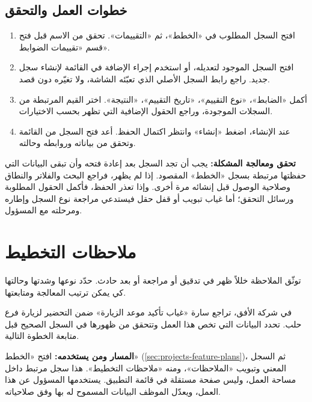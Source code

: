\subsection{خطوات العمل والتحقق}
\begin{enumerate}
\item افتح السجل المطلوب في «الخطط»، ثم «التقييمات». تحقق من الاسم قبل فتح قسم «تقييمات الضوابط».
\item افتح السجل الموجود لتعديله، أو استخدم إجراء الإضافة في القائمة لإنشاء سجل جديد. راجع رابط السجل الأصلي الذي تعبّئه الشاشة، ولا تغيّره دون قصد.
\item أكمل «الضابط»، «نوع التقييم»، «تاريخ التقييم»، «النتيجة». اختر القيم المرتبطة من السجلات الموجودة، وراجع الحقول الإضافية التي تظهر بحسب الاختيارات.
\item عند الإنشاء، اضغط «إنشاء» وانتظر اكتمال الحفظ. أعد فتح السجل من القائمة وتحقق من بياناته وروابطه وحالته.
\end{enumerate}

\textbf{تحقق ومعالجة المشكلة:} يجب أن تجد السجل بعد إعادة فتحه وأن تبقى البيانات التي حفظتها مرتبطة بسجل «الخطط» المقصود. إذا لم يظهر، فراجع البحث والفلاتر والنطاق وصلاحية الوصول قبل إنشائه مرة أخرى. وإذا تعذر الحفظ، فأكمل الحقول المطلوبة ورسائل التحقق؛ أما غياب تبويب أو قفل حقل فيستدعي مراجعة نوع السجل وإطاره ومرحلته مع المسؤول.

\clearpage
\section{ملاحظات التخطيط}
\label{sec:projects-feature-planning-findings}

توثّق الملاحظة خللاً ظهر في تدقيق أو مراجعة أو بعد حادث. حدّد نوعها وشدتها وحالتها كي يمكن ترتيب المعالجة ومتابعتها.

\begin{rcnote}
في شركة الأفق، تراجع سارة «غياب تأكيد موعد الزيارة» ضمن التحضير لزيارة فرع حلب. تحدد البيانات التي تخص هذا العمل وتتحقق من ظهورها في السجل الصحيح قبل متابعة الخطوة التالية.
\end{rcnote}

\textbf{المسار ومن يستخدمه:} افتح «الخطط» (\ref{sec:projects-feature-plans})، ثم السجل المعني وتبويب «الملاحظات»، ومنه «ملاحظات التخطيط». هذا سجل مرتبط داخل مساحة العمل، وليس صفحة مستقلة في قائمة التطبيق. يستخدمها المسؤول عن هذا العمل، ويعدّل الموظف البيانات المسموح له بها وفق صلاحياته.

